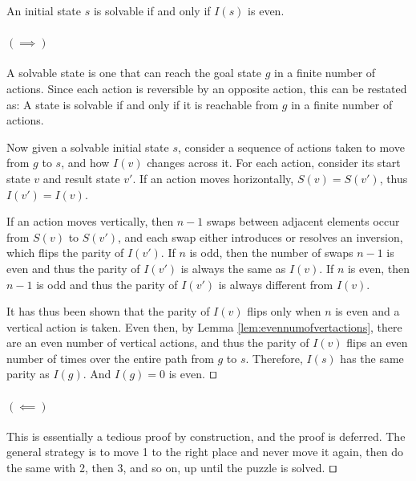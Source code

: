 \documentclass[runningheads]{llncs}
\begin{document}
\begin{theorem}\label{thm:solvability}
An initial state $s$ is solvable if and only if $I(s)$ is even.
\end{theorem}
\paragraph{$(\implies)$}
A solvable state is one that can reach the goal state $g$ in a finite number of actions. Since each action is reversible by an opposite action, this can be restated as: A state is solvable if and only if it is reachable from $g$ in a finite number of actions.

Now given a solvable initial state $s$, consider a sequence of actions taken to move from $g$ to $s$, and how $I(v)$ changes across it. For each action, consider its start state $v$ and result state $v'$. If an action moves horizontally, $S(v) = S(v')$, thus $I(v') = I(v)$.

If an action moves vertically, then $n-1$ swaps between adjacent elements occur from $S(v)$ to $S(v')$, and each swap either introduces or resolves an inversion, which flips the parity of $I(v')$. If $n$ is odd, then the number of swaps $n-1$ is even and thus the parity of $I(v')$ is always the same as $I(v)$. If $n$ is even, then $n-1$ is odd and thus the parity of $I(v')$ is always different from $I(v)$.

It has thus been shown that the parity of $I(v)$ flips only when $n$ is even and a vertical action is taken. Even then, by Lemma \ref{lem:evennumofvertactions}, there are an even number of vertical actions, and thus the parity of $I(v)$ flips an even number of times over the entire path from $g$ to $s$. Therefore, $I(s)$ has the same parity as $I(g)$. And $I(g) = 0$ is even.
$\qed$

\paragraph{$(\impliedby)$}
This is essentially a tedious proof by construction, and the proof is deferred. The general strategy is to move 1 to the right place and never move it again, then do the same with 2, then 3, and so on, up until the puzzle is solved.
$\qed$






\end{document}
